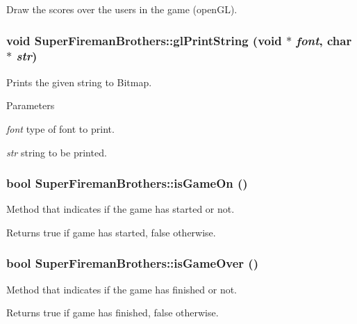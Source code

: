 \label{classSuperFiremanBrothers_a6376657264e9c488f276e66f25f9ce08}
Draw the scores over the users in the game (openGL). \hypertarget{classSuperFiremanBrothers_a3438445a5d0cdc5863dd28edc4bbccbd}{
\subsubsection[{glPrintString}]{\setlength{\rightskip}{0pt plus 5cm}void SuperFiremanBrothers::glPrintString (void $\ast$ {\em font}, \/  char $\ast$ {\em str})}}
\label{classSuperFiremanBrothers_a3438445a5d0cdc5863dd28edc4bbccbd}
Prints the given string to Bitmap. 
\begin{DoxyParams}{Parameters}
\item[{\em font}]type of font to print. \item[{\em str}]string to be printed. \end{DoxyParams}
\hypertarget{classSuperFiremanBrothers_a7e3951702064c2d473283e1eb8057b77}{
\subsubsection[{isGameOn}]{\setlength{\rightskip}{0pt plus 5cm}bool SuperFiremanBrothers::isGameOn ()}}
\label{classSuperFiremanBrothers_a7e3951702064c2d473283e1eb8057b77}
Method that indicates if the game has started or not. \begin{DoxyReturn}{Returns}
true if game has started, false otherwise. 
\end{DoxyReturn}
\hypertarget{classSuperFiremanBrothers_a2a4f3c77b730abb5a90e281601cf9440}{
\subsubsection[{isGameOver}]{\setlength{\rightskip}{0pt plus 5cm}bool SuperFiremanBrothers::isGameOver ()}}
\label{classSuperFiremanBrothers_a2a4f3c77b730abb5a90e281601cf9440}
Method that indicates if the game has finished or not. \begin{DoxyReturn}{Returns}
true if game has finished, false otherwise. 
\end{DoxyReturn}
